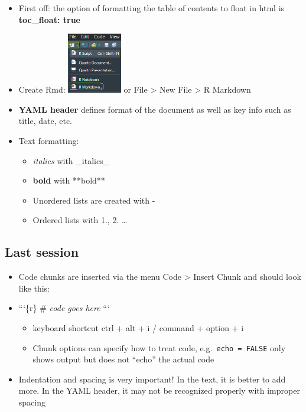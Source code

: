 \documentclass[
]{book}
\providecommand{\tightlist}{%
  \setlength{\itemsep}{0pt}\setlength{\parskip}{0pt}}
\begin{document}
\begin{itemize}
\tightlist
\item
  First off: the option of formatting the table of contents to float in html is \textbf{toc\_float: true}
\item
  Create Rmd: \includegraphics[width=\textwidth,height=1.04167in]{./img/rmd-click.png} or File \textgreater{} New File \textgreater{} R Markdown
\item
  \textbf{YAML header} defines format of the document as well as key info such as title, date, etc.
\item
  Text formatting:

  \begin{itemize}
  \tightlist
  \item
    \emph{italics} with \_italics\_
  \item
    \textbf{bold} with **bold**
  \item
    Unordered lists are created with -
  \item
    Ordered lists with 1., 2. \ldots{}
  \end{itemize}
\end{itemize}

\subsection{Last session}\label{last-session}

\begin{itemize}
\tightlist
\item
  Code chunks are inserted via the menu Code \textgreater{} Insert Chunk and should look like this:
\item
  ```\{r\}
  \# \emph{code goes here}
  ```

  \begin{itemize}
  \tightlist
  \item
    keyboard shortcut ctrl + alt + i / command + option + i
  \item
    Chunk options can specify how to treat code, e.g.~\texttt{echo\ =\ FALSE} only shows output but does not ``echo'' the actual code
  \end{itemize}
\item
  Indentation and spacing is very important! In the text, it is better to add more. In the YAML header, it may not be recognized properly with improper spacing
\end{itemize}
\end{document}
